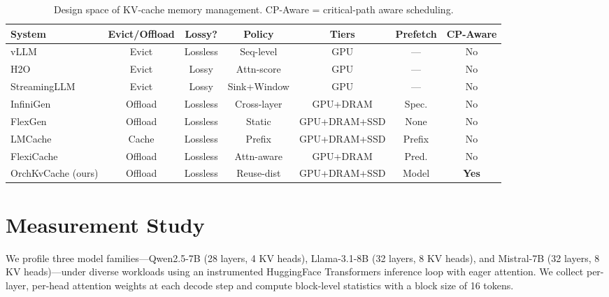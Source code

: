 \documentclass[acmsmall,nonacm,screen]{acmart}
\newcommand{\sys}{OrchKvCache}
\begin{document}
\begin{table}[t]
\centering
\caption{Design space of KV-cache memory management.  CP-Aware = critical-path
  aware scheduling.}
\label{tab:taxonomy}
\begin{tabular}{lcccccc}
\toprule
\textbf{System} & \textbf{Evict/Offload} & \textbf{Lossy?} &
  \textbf{Policy} & \textbf{Tiers} & \textbf{Prefetch} &
  \textbf{CP-Aware} \\
\midrule
vLLM~\cite{kwon2023vllm}           & Evict   & Lossless & Seq-level & GPU          & ---       & No  \\
H2O~\cite{zhang2024h2o}            & Evict   & Lossy    & Attn-score & GPU         & ---       & No  \\
StreamingLLM~\cite{xiao2024streamingllm} & Evict & Lossy & Sink+Window & GPU       & ---       & No  \\
InfiniGen~\cite{lee2024infinigen}   & Offload & Lossless & Cross-layer & GPU+DRAM     & Spec.   & No  \\
FlexGen~\cite{sheng2023flexgen}     & Offload & Lossless & Static   & GPU+DRAM+SSD & None    & No  \\
LMCache~\cite{yao2024lmcache}      & Cache   & Lossless & Prefix   & GPU+DRAM+SSD & Prefix  & No  \\
FlexiCache~\cite{li2024flexicache} & Offload & Lossless & Attn-aware & GPU+DRAM   & Pred.   & No  \\
\midrule
\sys{} (ours) & Offload & Lossless & Reuse-dist & GPU+DRAM+SSD & Model & \textbf{Yes} \\
\bottomrule
\end{tabular}
\end{table}


\section{Measurement Study}\label{sec:measurement}

We profile three model families---Qwen2.5-7B (28 layers, 4 KV heads),
Llama-3.1-8B (32 layers, 8 KV heads), and Mistral-7B (32 layers, 8 KV
heads)---under diverse workloads using an instrumented HuggingFace
Transformers inference loop with eager attention.  We collect per-layer,
per-head attention weights at each decode step and compute block-level
statistics with a block size of 16 tokens.
\end{document}
